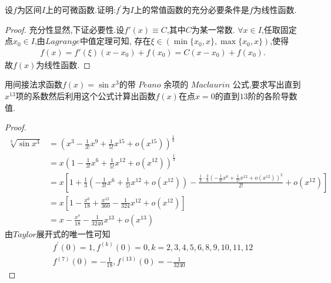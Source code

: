 \documentclass[lang=cn,newtx,10pt,scheme=chinese]{elegantbook}
\begin{document}
\begin{exercise}
设\(f\)为区间\(I\)上的可微函数.证明:\(f^{\prime}\)为\(I\)上的常值函数的充分必要条件是\(f\)为线性函数.
\end{exercise}
\begin{proof}
充分性显然,下证必要性.设$f'(x)\equiv C$,其中$C$为某一常数.
$\forall x\in I$,任取固定点$x_0\in I$,由$Lagrange$中值定理可知,
存在$\xi\in(\min\{x_0,x\},\max\{x_0,x\})$,使得
\begin{align*}
f(x)=f'(\xi)(x-x_0)+f(x_0)=C(x-x_0)+f(x_0).
\end{align*}
故$f(x)$为线性函数.
\end{proof}

\begin{exercise}
    用间接法求函数\(f(x)=\sin x^3\)的带 $Peano$ 余项的 $Maclaurin$ 公式,要求写出直到\(x^{13}\)项的系数然后利用这个公式计算出函数\(f(x)\)在点\(x = 0\)的直到\(13\)阶的各阶导数值.
    \begin{proof}
        \begin{equation}
            \begin{split}
                \sqrt[3]{\sin x^3}&=\left( x^3-\frac{1}{3!}x^9+\frac{1}{5!}x^{15}+o\left( x^{15} \right) \right) ^{\frac{1}{3}}
\\
&=x\left( 1-\frac{1}{3!}x^6+\frac{1}{5!}x^{12}+o\left( x^{12} \right) \right) ^{\frac{1}{3}}
\\
&=x\left[ 1+\frac{1}{3}\left( -\frac{1}{3!}x^6+\frac{1}{5!}x^{12}+o\left( x^{12} \right) \right) -\frac{\frac{1}{3}\cdot \frac{2}{3}\left( -\frac{1}{3!}x^6+\frac{1}{5!}x^{12}+o\left( x^{12} \right) \right) ^2}{2!}+o\left( x^{12} \right) \right] 
\\
&=x\left[ 1-\frac{x^6}{18}+\frac{x^{12}}{360}-\frac{1}{324}x^{12}+o\left( x^{12} \right) \right]\\
&=x-\frac{x^7}{18}-\frac{1}{3240}x^{13}+o\left( x^{13} \right)
            \end{split}
            \nonumber
        \end{equation}
        由$Taylor$展开式的唯一性可知
        \begin{gather}
            f^{\prime}(0)=1,f^{(k)}(0)=0,k=2,3,4,5,6,8,9,10,11,12\nonumber\\
            f^{(7)}(0)=-\frac{1}{18},f^{(13)}(0)=-\frac{1}{3240}\nonumber
        \end{gather}
    \end{proof}
\end{exercise}
\end{document}
